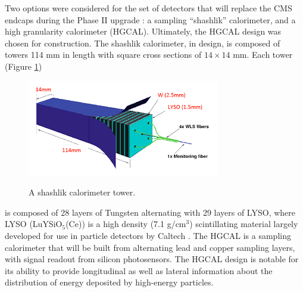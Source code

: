 Two options were considered for the set of detectors that will replace the CMS endcaps during the Phase II upgrade \cite{Bilki:2015rla}: a sampling ``shashlik'' calorimeter, and a high granularity calorimeter (HGCAL). Ultimately, the HGCAL design was chosen for construction. The shashlik calorimeter, in design, is composed of towers 114 mm in length with square cross sections of $14\times14$ mm. Each tower (Figure \ref{fig:shashtower})
\begin{figure}[h]\centering
\includegraphics[width=0.6\linewidth]{figures/CMS/Upgrade/ShashlikTower.png}\\
\caption{A shashlik calorimeter tower. }
\label{fig:shashtower}
\end{figure}
is composed of 28 layers of Tungsten alternating with 29 layers of LYSO, where LYSO (LuYSiO$_5$(Ce)) is a high density (7.1 g/cm$^3$) scintillating material largely developed for use in particle detectors by Caltech \cite{Chen:2007bb}. The HGCAL is a sampling calorimeter that will be built from alternating lead and copper sampling layers, with signal readout from silicon photosensors. The HGCAL design is notable for its ability to provide longitudinal as well as lateral information about the distribution of energy deposited by high-energy particles.

